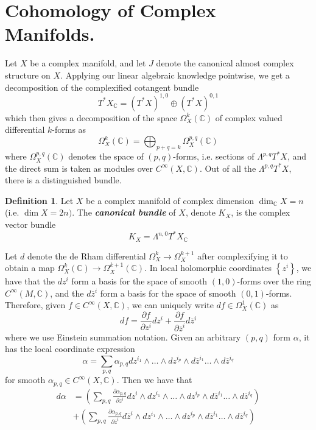 \documentclass[psamsfonts, 12pt]{amsart}
\theoremstyle{definition}
\newtheorem{defn}[thm]{Definition}
\theoremstyle{remark}
\newcommand{\ib}[1]{\textbf{\textit{#1}}}
\newcommand{\C}{\mathbb{C}}
\newcommand{\set}[1]{\left\lbrace #1 \right\rbrace}
\begin{document}
\section{Cohomology of Complex Manifolds.}
%
Let $X$ be a complex manifold, and let $J$ denote the canonical almost complex structure
on $X$. Applying our linear algebraic knowledge pointwise, we get a decomposition of
the complexified cotangent bundle
\[
T^*X_\C = (T^*X)^{1,0} \oplus (T^*X)^{0,1}
\]
%
which then gives a decomposition of the space $\Omega^k_X(\C)$ of complex valued
differential $k$-forms as
\[
\Omega^k_X(\C) = \bigoplus_{p+q=k}\Omega^{p,q}_X(\C)
\]
where $\Omega^{p,q}_X(\C)$ denotes the space of $(p,q)$-forms, i.e. sections of
$\Lambda^{p,q}T^*X$, and the direct sum is taken as modules over $C^\infty(X,\C)$.
Out of all the $\Lambda^{p,q}T^*X$, there is a distinguished bundle.
%
\begin{defn}
Let $X$ be a complex manifold of complex dimension $\dim_\C X = n$ (i.e. $\dim X = 2n)$.
The \ib{canonical bundle} of $X$, denote $K_X$, is the complex vector bundle
\[
K_X = \Lambda^{n,0}T^*X_\C
\]
\end{defn}
%
Let $d$ denote the de Rham differential $\Omega^k_X \to \Omega^{k+1}_X$ after
complexifying it to obtain a map $\Omega^k_X(\C) \to \Omega^{k+1}_X(\C)$. In local
holomorphic coordinates $\set{z^i}$, we have that the $dz^i$ form a basis for the space
of smooth $(1,0)$-forms over the ring $C^\infty(M,\C)$, and the $d\overline{z}^i$ form a
basis for the space of smooth $(0,1)$-forms. Therefore, given $f \in C^\infty(X,\C)$, we
can uniquely write $df \in \Omega^1_X(\C)$ as
\[
df = \frac{\partial f}{\partial z^i}dz^i +
\frac{\partial f}{\partial\overline{z}^i}d\overline{z}^i
\]
where we use Einstein summation notation. Given an arbitrary $(p,q)$ form $\alpha$, it
has the local coordinate expression
\[
\alpha = \sum_{p,q} \alpha_{p,q} dz^{i_1} \wedge \ldots \wedge dz^{i_p} \wedge
d\overline{z}^{i_1}\ldots \wedge d\overline{z}^{i_q}
\]
for smooth $\alpha_{p,q} \in C^\infty(X,\C)$. Then we have that
%
\begin{align*}
d\alpha &= \left(\sum_{p,q}\frac{\partial\alpha_{p,q}}{\partial z^i} dz^i
\wedge dz^{i_1} \wedge \ldots \wedge dz^{i_p} \wedge
d\overline{z}^{i_1}\ldots \wedge d\overline{z}^{i_q}\right) \\[5pt]
&+ \left(
\sum_{p,q}\frac{\partial\alpha_{p,q}}{\partial \overline{z}^i} d\overline{z}^i
\wedge dz^{i_1} \wedge \ldots \wedge dz^{i_p} \wedge
d\overline{z}^{i_1}\ldots \wedge d\overline{z}^{i_q}
\right)
\end{align*}
\end{document}
